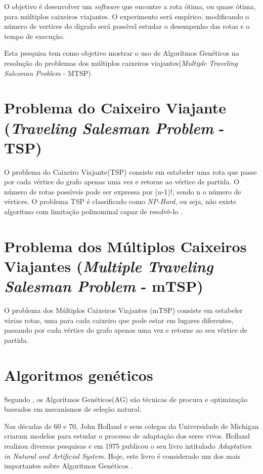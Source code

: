 \documentclass{abnt}
\begin{document}
		O objetivo é desenvolver um \textit{software} que encontre a rota ótima, ou quase ótima, para múltiplos caixeiros viajantes. O experimento será empírico, modificando o número de vertices do digrafo será possível estudar o desempenho das rotas e o tempo de execução.

		Esta pesquisa tem como objetivo mostrar o uso de Algorítmos Genéticos na resolução do problemas dos múltiplos caixeiros viajantes(\textit{Multiple Traveling Salesman Problem} - MTSP)

	\section{Problema do Caixeiro Viajante (\textit{Traveling Salesman Problem} - TSP)}

		O problema do Caixeiro Viajante(TSP) consiste em estabeler uma rota que passe por cada vértice do grafo apenas uma vez e retorne ao vértice de partida. O número de rotas possíveis pode ser expressa por (n-1)!, sendo n o número de vértices.
		O problema TSP é classificado como \textit{NP-Hard}, ou seja, não existe algoritmo com limitação polinominal capaz de resolvẽ-lo \cite{0010-pdf}.

	\section{Problema  dos Múltiplos Caixeiros Viajantes (\textit{Multiple Traveling Salesman Problem} - mTSP)}

	O problema dos Múltiplos Caixeiros Viajantes (mTSP) consiste em estabeler várias rotas, uma para cada caixeiro que pode estar em lugares diferentes, passando por cada vértice do grafo apenas uma vez e retorne ao seu vértice de partida. 


	\section{Algoritmos genéticos}

		Segundo \cite{0008-pdf}, os Algoritmos Genéticos(AG) são técnicas de procura e optimização baseados em mecanismos de seleção natural. 

		Nas décadas de 60 e 70, John Holland e seus colegas da Universidade de Michigan criaram modelos para estudar o processo de adaptação dos seres vivos. Holland realizou diversas pesquisas e em 1975 publicou o seu livro intitulado \textit{Adaptation in Natural and Artificial System}. Hoje, este livro é considerado um dos mais importantes sobre Algoritmos Genéticos \cite{0001-pdf}.
\end{document}
